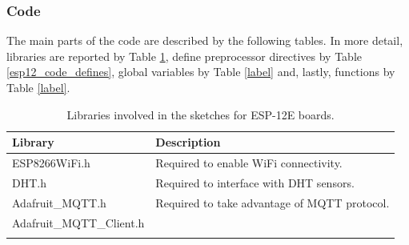 \subsubsection{Code}
The main parts of the code are described by the following tables. In more detail, libraries are reported by Table \ref{esp12_code_libraries}, define preprocessor directives by Table \ref{esp12_code_defines}, global variables by Table \ref{label} and, lastly, functions by Table \ref{label}.

\noindent\begin{minipage}{\textwidth}
\begingroup
\setlength{\LTleft}{-20cm plus -1fill}
\setlength{\LTright}{\LTleft}
	\begin{longtable}{l | l}
		\hline
		\textbf{Library} & \textbf{Description} \\
		\hline
		\hline
		ESP8266WiFi.h & Required to enable WiFi connectivity. \\
		\hline
		DHT.h & Required to interface with DHT sensors. \\
		\hline
		Adafruit\_MQTT.h & Required to take advantage of MQTT protocol. \\ 
		Adafruit\_MQTT\_Client.h &  \\
		\hline

	\caption{Libraries involved in the sketches for ESP-12E boards.}
	\label{esp12_code_libraries}
	\end{longtable}
\endgroup
\end{minipage}

